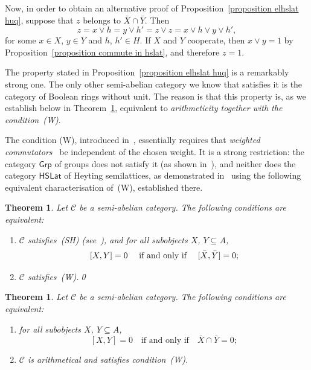 \documentclass[reqno,a4paper]{amsart}
\newtheorem{theorem}[lemma]{Theorem}
\theoremstyle{remark}
\theoremstyle{definition}
\newenvironment{tfae}
{\renewcommand{\labelenumi}{(\roman{enumi})}
	\begin{enumerate}}
	{\end{enumerate}}
\newcommand{\noproof}{\hfill \qed}
\newcommand{\SH}{{\rm (SH)}}
\newcommand{\W}{{\rm (W)}}
\newcommand{\oleq}{\subseteq} %
\newcommand{\omeet}{\cap} %
\newcommand{\HSLat}{\ensuremath{\mathsf{HSLat}}}
\newcommand{\Grp}{\ensuremath{\mathsf{Grp}}}
\newcommand{\C}{\ensuremath{\mathcal{C}}}
\begin{document}
Now, in order to obtain an alternative proof of Proposition~\ref{proposition elhslat huq}, suppose that \(z\) belongs to \(\bar X \omeet \bar Y\).
Then
\[
	z = x \vee h = y \vee h' = z \vee z = x \vee h \vee y \vee h',
\]
for some \(x\in X\), \(y\in Y\) and \(h\), \(h'\in H\).
If \(X\) and \(Y\) cooperate, then \(x \vee y = 1\) by Proposition~\ref{proposition commute in hslat}, and therefore \(z = 1\).


The property stated in Proposition~\ref{proposition elhslat huq} is a remarkably strong one. The only other semi-abelian category we know that satisfies it is the category of Boolean rings without unit. The reason is that this property is, as we establish below in Theorem~\ref{theorem arithmetical and w}, equivalent to \emph{arithmeticity together with the condition~\W{}}.

The condition \W{}, introduced in~\cite{MFVdL3}, essentially requires that \emph{weighted commutators}~\cite{GJU} be independent of the chosen weight. It is a strong restriction: the category \(\Grp\) of groups does not satisfy it (as shown in~\cite{MFVdL3}), and neither does the category \(\HSLat\) of Heyting semilattices, as demonstrated in~\cite{HSLat} using the following equivalent characterisation of~\W{}, established there.

\begin{theorem}\label{theorem w}
	Let \(\C\) be a semi-abelian category. The following conditions are equivalent:
	\begin{tfae}
		\item \(\C\) satisfies~\SH{} (see~\cite{MFVdL}), and for all subobjects \(X\), \(Y \oleq A\),
		\[
			\text{\([X,Y] = 0\) \quad if and only if \quad \([\bar X, \bar Y] = 0\);}
		\]
		\item \(\C\) satisfies~\W{}.\noproof
	\end{tfae}
\end{theorem}

\begin{theorem}\label{theorem arithmetical and w}
	Let \(\C\) be a semi-abelian category. The following conditions are equivalent:
	\begin{tfae}
		\item for all subobjects \(X\), \(Y \oleq A\),
		\[
			[X,Y] = 0 \quad \text{if and only if} \quad \bar X \omeet \bar Y = 0;
		\]
		\item \(\C\) is arithmetical and satisfies condition~\W{}.
	\end{tfae}
\end{theorem}
\end{document}
